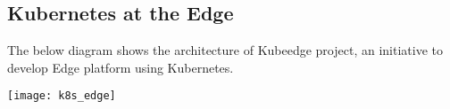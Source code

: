 \subsection{Kubernetes at the Edge}

\begin{flushleft}
The below diagram shows the architecture of Kubeedge project, an initiative to develop Edge platform using Kubernetes.

\texttt{[image: k8s\_edge]}
	
\end{flushleft}
